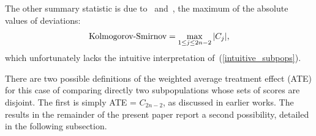 \documentclass[]{fairmeta}
\begin{document}
The other summary statistic is due to~\cite{kolmogorov} and~\cite{smirnov},
the maximum of the absolute values of deviations:
%
\begin{equation}
\hbox{Kolmogorov-Smirnov} = \max_{1 \le j \le 2n-2} |C_j|,
\end{equation}
%
which unfortunately lacks the intuitive interpretation
of~(\ref{intuitive_subpops}).

There are two possible definitions of the weighted average treatment effect
(ATE) for this case of comparing directly two subpopulations whose sets
of scores are disjoint. The first is simply ATE = $C_{2n-2}$,
as discussed in earlier works. The results in the remainder
of the present paper report a second possibility,
detailed in the following subsection.


\begin{figure}
%
\begin{center}
\quad\quad\quad\quad
{}
\end{center}
\end{figure}
\end{document}
